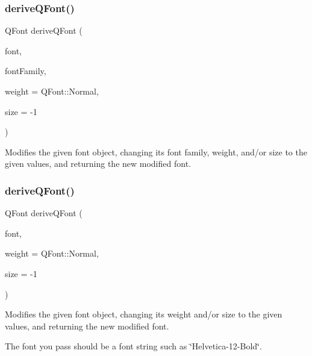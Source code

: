 \subsubsection{\texorpdfstring{derive\+Q\+Font()}{deriveQFont()}\hspace{0.1cm}{\footnotesize\ttfamily [2/4]}}
{\footnotesize\ttfamily Q\+Font derive\+Q\+Font (\begin{DoxyParamCaption}\item[{const Q\+Font \&}]{font,  }\item[{const std\+::string \&}]{font\+Family,  }\item[{Q\+Font\+::\+Weight}]{weight = {\ttfamily QFont\+:\+:Normal},  }\item[{int}]{size = {\ttfamily -\/1} }\end{DoxyParamCaption})\hspace{0.3cm}{\ttfamily [static]}}



Modifies the given font object, changing its font family, weight, and/or size to the given values, and returning the new modified font. 

\mbox{\label{classGFont_a6fdde28adfdce9b43b7eb4d4a47ca23b}} 
\subsubsection{\texorpdfstring{derive\+Q\+Font()}{deriveQFont()}\hspace{0.1cm}{\footnotesize\ttfamily [3/4]}}
{\footnotesize\ttfamily Q\+Font derive\+Q\+Font (\begin{DoxyParamCaption}\item[{const std\+::string \&}]{font,  }\item[{Q\+Font\+::\+Weight}]{weight = {\ttfamily QFont\+:\+:Normal},  }\item[{int}]{size = {\ttfamily -\/1} }\end{DoxyParamCaption})\hspace{0.3cm}{\ttfamily [static]}}



Modifies the given font object, changing its weight and/or size to the given values, and returning the new modified font. 

The font you pass should be a font string such as \char`\"{}\+Helvetica-\/12-\/\+Bold\char`\"{}. \mbox{\label{classGFont_a50c41ebc7de0a4a038852b0764d3a6f2}} 
